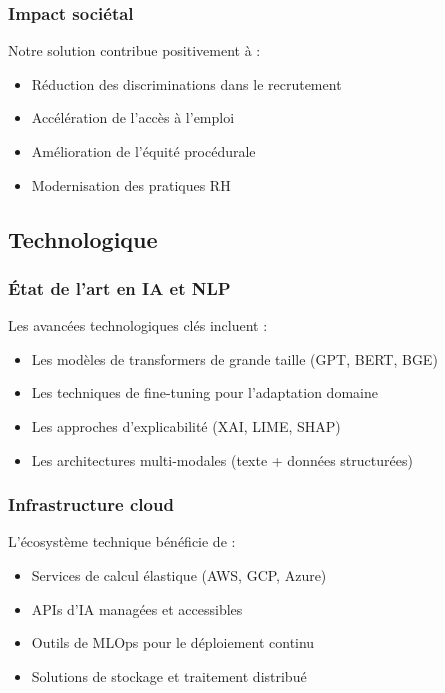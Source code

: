 \documentclass[12pt,a4paper]{report}
\begin{document}
\subsubsection{Impact sociétal}

Notre solution contribue positivement à :
\begin{itemize}
\item Réduction des discriminations dans le recrutement
\item Accélération de l'accès à l'emploi
\item Amélioration de l'équité procédurale
\item Modernisation des pratiques RH
\end{itemize}

\subsection{Technologique}

\subsubsection{État de l'art en IA et NLP}

Les avancées technologiques clés incluent :
\begin{itemize}
\item Les modèles de transformers de grande taille (GPT, BERT, BGE)
\item Les techniques de fine-tuning pour l'adaptation domaine
\item Les approches d'explicabilité (XAI, LIME, SHAP)
\item Les architectures multi-modales (texte + données structurées)
\end{itemize}

\subsubsection{Infrastructure cloud}

L'écosystème technique bénéficie de :
\begin{itemize}
\item Services de calcul élastique (AWS, GCP, Azure)
\item APIs d'IA managées et accessibles
\item Outils de MLOps pour le déploiement continu
\item Solutions de stockage et traitement distribué
\end{itemize}
\end{document}
